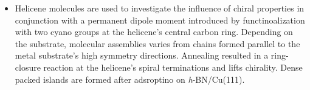 \begin{itemize}
	\item Helicene molecules are used to investigate the influence of chiral properties in conjunction with a permanent dipole moment introduced by functinoalization with two cyano groups at the helicene's central carbon ring. Depending on the substrate, molecular assemblies varies from chains formed parallel to the metal substrate's high symmetry directions. Annealing resulted in a ring-closure reaction at the helicene's spiral terminations and lifts chirality. Dense packed islands are formed after adsroptino on \textit{h}-BN/Cu(111).
\end{itemize}
